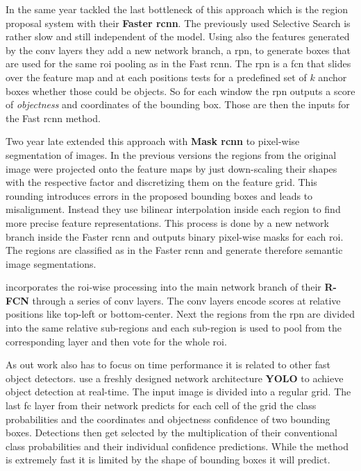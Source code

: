 In the same year \citet{ren_faster_2015} tackled the last bottleneck of this approach which is the region proposal system with their \textbf{Faster \gls{rcnn}}. The previously used Selective Search is rather slow and still independent of the model. Using also the features generated by the \gls{conv} layers they add a new network branch, a \gls{rpn}, to generate boxes that are used for the same \gls{roi} pooling as in the Fast \gls{rcnn}. The \gls{rpn} is a \gls{fcn} that slides over the feature map and at each positions tests for a predefined set of $k$ anchor boxes whether those could be objects. So for each window the \gls{rpn} outputs a score of \textit{objectness} and coordinates of the bounding box. Those are then the inputs for the Fast \gls{rcnn} method.

Two year late \citet{he_mask_2017} extended this approach with \textbf{Mask \gls{rcnn}} to pixel-wise segmentation of images. In the previous versions the regions from the original image were projected onto the feature maps by just down-scaling their shapes with the respective factor and discretizing them on the feature grid. This rounding introduces errors in the proposed bounding boxes and leads to misalignment. Instead they use bilinear interpolation inside each region to find more precise feature representations. This process is done by a new network branch inside the Faster \gls{rcnn} and outputs binary pixel-wise masks for each \gls{roi}. The regions are classified as in the Faster \gls{rcnn} and generate therefore semantic image segmentations.

\citet{dai_r-fcn:_2016} incorporates the \gls{roi}-wise processing into the main network branch of their \textbf{R-FCN} through a series of \gls{conv} layers. The \gls{conv} layers encode scores at relative positions like top-left or bottom-center. Next the regions from the \gls{rpn} are divided into the same relative sub-regions and each sub-region is used to pool from the corresponding layer and then vote for the whole \gls{roi}.

As out work also has to focus on time performance it is related to other fast object detectors. \citet{redmon_you_2016} use a freshly designed network architecture \textbf{YOLO} to achieve object detection at real-time. The input image is divided into a regular grid. The last \gls{fc} layer from their network predicts for each cell of the grid the class probabilities and the coordinates and objectness confidence of two bounding boxes. Detections then get selected by the multiplication of their conventional class probabilities and their individual confidence predictions. While the method is extremely fast it is limited by the shape of bounding boxes it will predict.

